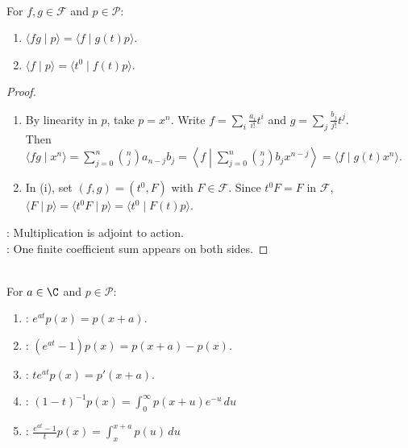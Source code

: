 \begin{theorem} \label{thm:umbral-functional-operator-adjointness} \\
For $f,g\in\mathscr{F}$ and $p\in\mathscr{P}$:
\begin{enumerate}[label=(\roman*)]
\setlength{\itemsep}{0pt}
\item $\langle fg\mid p\rangle=\langle f\mid g(t)p\rangle$.
\item $\langle f\mid p\rangle=\langle t^0\mid f(t)p\rangle$.
\end{enumerate}
\begin{proof}
\begin{enumerate}[label=(\roman*)]
\setlength{\itemsep}{0pt}
\item By linearity in $p$, take $p=x^n$. Write $f=\sum\limits_i\frac{a_i}{i!}t^i$ and $g=\sum\limits_j\frac{b_j}{j!}t^j$.\\
Then $\langle fg\mid x^n\rangle=\sum\limits_{j=0}^{n}\binom{n}{j}a_{n-j}b_j=\left\langle f\middle|\sum\limits_{j=0}^{n}\binom{n}{j}b_jx^{n-j}\right\rangle=\langle f\mid g(t)x^n\rangle$.
\item In (i), set $(f,g)=(t^0,F)$ with $F\in\mathscr{F}$. Since $t^0F=F$ in $\mathscr{F}$, $\langle F\mid p\rangle=\langle t^0F\mid p\rangle=\langle t^0\mid F(t)p\rangle$.
\end{enumerate}
: Multiplication is adjoint to action.\\
: One finite coefficient sum appears on both sides.
\end{proof}
\end{theorem}

\begin{definition} \label{def:umbral-operators-basic-examples} \\
For $a\in\C$ and $p\in\mathscr{P}$:
\begin{enumerate}[label=(\roman*)]
\setlength{\itemsep}{0pt}
\item {}: $e^{at}p(x)=p(x+a)$.
\item {}: $(e^{at}-1)p(x)=p(x+a)-p(x)$.
\item {}: $te^{at}p(x)=p'(x+a)$.
\item {}: $(1-t)^{-1}p(x)=\int_0^\infty p(x+u)e^{-u}\,du$
\item {}: $\frac{e^{at}-1}{t}p(x)=\int_x^{x+a}p(u)\,du$
\end{enumerate}
\end{definition}

